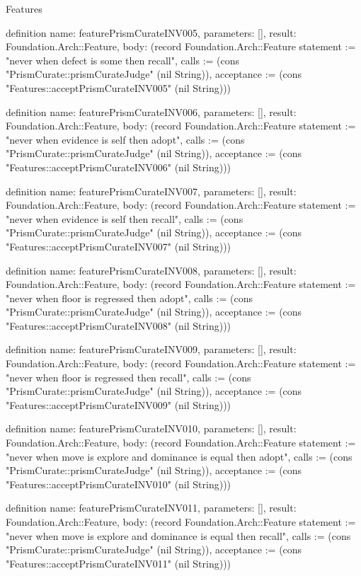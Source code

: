\begin{lexlean}{Features}
\begin{semanticmodule}
definition{
  name: featurePrismCurateINV005,
  parameters: [],
  result: Foundation.Arch::Feature,
  body: (record Foundation.Arch::Feature {statement := "never when defect is some then recall", calls := (cons "PrismCurate::prismCurateJudge" (nil String)), acceptance := (cons "Features::acceptPrismCurateINV005" (nil String))})
}

definition{
  name: featurePrismCurateINV006,
  parameters: [],
  result: Foundation.Arch::Feature,
  body: (record Foundation.Arch::Feature {statement := "never when evidence is self then adopt", calls := (cons "PrismCurate::prismCurateJudge" (nil String)), acceptance := (cons "Features::acceptPrismCurateINV006" (nil String))})
}

definition{
  name: featurePrismCurateINV007,
  parameters: [],
  result: Foundation.Arch::Feature,
  body: (record Foundation.Arch::Feature {statement := "never when evidence is self then recall", calls := (cons "PrismCurate::prismCurateJudge" (nil String)), acceptance := (cons "Features::acceptPrismCurateINV007" (nil String))})
}

definition{
  name: featurePrismCurateINV008,
  parameters: [],
  result: Foundation.Arch::Feature,
  body: (record Foundation.Arch::Feature {statement := "never when floor is regressed then adopt", calls := (cons "PrismCurate::prismCurateJudge" (nil String)), acceptance := (cons "Features::acceptPrismCurateINV008" (nil String))})
}

definition{
  name: featurePrismCurateINV009,
  parameters: [],
  result: Foundation.Arch::Feature,
  body: (record Foundation.Arch::Feature {statement := "never when floor is regressed then recall", calls := (cons "PrismCurate::prismCurateJudge" (nil String)), acceptance := (cons "Features::acceptPrismCurateINV009" (nil String))})
}

definition{
  name: featurePrismCurateINV010,
  parameters: [],
  result: Foundation.Arch::Feature,
  body: (record Foundation.Arch::Feature {statement := "never when move is explore and dominance is equal then adopt", calls := (cons "PrismCurate::prismCurateJudge" (nil String)), acceptance := (cons "Features::acceptPrismCurateINV010" (nil String))})
}

definition{
  name: featurePrismCurateINV011,
  parameters: [],
  result: Foundation.Arch::Feature,
  body: (record Foundation.Arch::Feature {statement := "never when move is explore and dominance is equal then recall", calls := (cons "PrismCurate::prismCurateJudge" (nil String)), acceptance := (cons "Features::acceptPrismCurateINV011" (nil String))})
}


\end{semanticmodule}
\end{lexlean}
